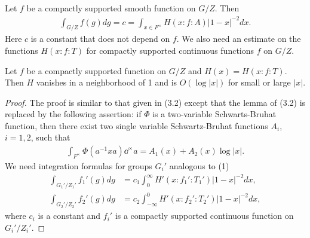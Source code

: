 \subsection{}
Let $f$ be a compactly supported smooth function on $G/Z$.
Then
\begin{align}
\label{4.3.1}
    \int_{G/Z} f(g)dg = c = \int_{x \in F^\times} H(x:f:A)|1 - x|^{-2} dx.
\end{align}
Here $c$ is a constant that does not depend on $f$.
We also need an estimate on the functions $H(x:f:T)$ for compactly supported continuous functions $f$  on $G/Z$.

\begin{lemma}
Let $f$ be a compactly supported function on $G/Z$ and $H(x) = H(x:f:T)$.
Then $H$ vanishes in a neighborhood of 1 and is $O(\log |x|)$ for small or large $|x|$.
\end{lemma}
\begin{proof}
The proof is similar to that given in (3.2) except that the lemma of (3.2) is replaced by the following assertion: if $\Phi$ is a two-variable Schwarts-Bruhat function, then there exist two single variable Schwartz-Bruhat functions $A_i$, $i = 1, 2$, such that
\begin{align*}
    \int_{F^\times} \Phi(a^{-1}x a) \dd^\times a = A_1(x) + A_2(x) \log |x|.
\end{align*}
We need integration formulas for groups $G_i'$ analogous to (1)
\begin{align}
    \int_{G_1' / Z_1'} f_1'(g) dg &= c_1 \int_{0}^{\infty} H'(x:f_1':T_1') |1 - x|^{-2} dx, \label{4.3.3} \\
    \int_{G_2' / Z_2'} f_2'(g) dg &= c_2 \int_{-\infty}^{0} H'(x:f_2':T_2') |1-x|^{-2} dx, \label{4.3.4}
\end{align}
where $c_i$ is a constant and $f_i'$ is a compactly supported continuous function on $G_i' / Z_i'$.
\end{proof}

